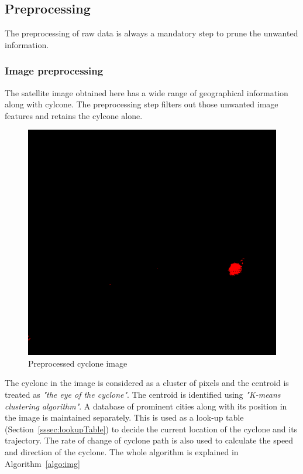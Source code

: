\documentclass{article}
\begin{document}
\subsection{Preprocessing}
\label{ssec:preProcessing}
	The preprocessing of raw data is always a mandatory step to prune the unwanted information. 


\subsubsection{Image preprocessing}
\label{sssec:imgPreprocessing}
The satellite image obtained here has a wide range of geographical information along with cylcone.
The preprocessing step filters out those unwanted image features and retains the cylcone alone. 

\begin{figure}[h!tb]
\centering
\includegraphics[scale=0.10]{figures/cycloneAlone.png}
\caption{Preprocessed cyclone image}
\label{fig:cycloneAlone}
\end{figure}

The cyclone in the image is considered as a cluster of pixels and the centroid is treated as {\it "the eye of the cyclone"}. The centroid is identified using {\it "K-means clustering algorithm"}. A database of prominent cities along with its position in the image is maintained separately. This is used as  a look-up table (Section~\ref{sssec:lookupTable}) to decide the current location of the cyclone and its trajectory. The rate of change of cyclone path is also used to calculate the speed and direction of the cyclone.  The whole algorithm is explained in Algorithm~\ref{algo:img}
\end{document}
